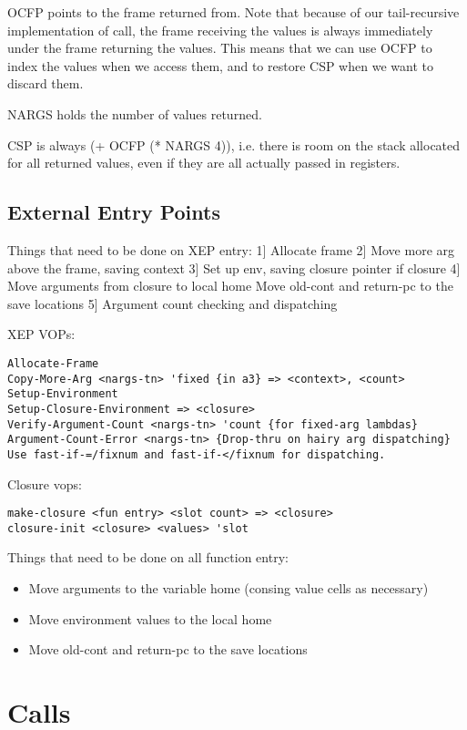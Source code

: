     OCFP points to the frame returned from.  Note that because of our
    tail-recursive implementation of call, the frame receiving the values is
    always immediately under the frame returning the values.  This means that
    we can use OCFP to index the values when we access them, and to restore
    CSP when we want to discard them.

    NARGS holds the number of values returned.

    CSP is always (+ OCFP (* NARGS 4)), i.e. there is room on the stack
    allocated for all returned values, even if they are all actually passed in
    registers.


\subsection{External Entry Points}

Things that need to be done on XEP entry:
 1] Allocate frame
 2] Move more arg above the frame, saving context
 3] Set up env, saving closure pointer if closure
 4] Move arguments from closure to local home
    Move old-cont and return-pc to the save locations
 5] Argument count checking and dispatching

XEP VOPs:
\begin{verbatim}
Allocate-Frame
Copy-More-Arg <nargs-tn> 'fixed {in a3} => <context>, <count>
Setup-Environment
Setup-Closure-Environment => <closure>
Verify-Argument-Count <nargs-tn> 'count {for fixed-arg lambdas}
Argument-Count-Error <nargs-tn> {Drop-thru on hairy arg dispatching}
Use fast-if-=/fixnum and fast-if-</fixnum for dispatching.
\end{verbatim}

Closure vops:
\begin{verbatim}
make-closure <fun entry> <slot count> => <closure>
closure-init <closure> <values> 'slot
\end{verbatim}

Things that need to be done on all function entry:
\begin{itemize}
\item Move arguments to the variable home (consing value cells as necessary)
\item Move environment values to the local home
\item Move old-cont and return-pc to the save locations
\end{itemize}

\section{Calls}

